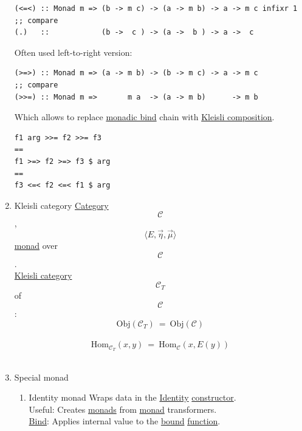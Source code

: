 \documentclass[11pt]{article}
\begin{document}
\begin{enumerate}
\begin{verbatim}
(<=<) :: Monad m => (b -> m c) -> (a -> m b) -> a -> m c infixr 1
;; compare
(.)   ::            (b ->  c ) -> (a ->  b ) -> a ->  c
\end{verbatim}

Often used left-to-right version:\\

\begin{verbatim}
(>=>) :: Monad m => (a -> m b) -> (b -> m c) -> a -> m c
;; compare
(>>=) :: Monad m =>       m a  -> (a -> m b)      -> m b
\end{verbatim}

Which allows to replace \hyperref[orge903a56]{monadic bind} chain with \hyperref[org0ada36c]{Kleisli composition}.\\

\begin{verbatim}
f1 arg >>= f2 >>= f3
==
f1 >=> f2 >=> f3 $ arg
==
f3 <=< f2 <=< f1 $ arg
\end{verbatim}

\item \label{org7512a35}Kleisli category
\label{sec:orgd411efe}
\hyperref[org0450535]{Category} $$ \mathcal{C} $$, $$ 〈E, \overrightarrow{\eta}, \overrightarrow{\mu}〉 $$ \hyperref[org86a5d95]{monad} over $$ \mathcal{C} $$.\\

\hyperref[org7512a35]{Kleisli category} $$ \mathcal{C}_{T} $$ of $$ \mathcal{C} $$:\\

$$ \mathrm{Obj}(\mathcal{C}_{T}) \ = \ \mathrm{Obj}(\mathcal{C}) $$\\
$$ \mathrm{Hom}_{\mathcal{C}_{T}}(x,y) \ = \ \mathrm{Hom}_{\mathcal{C}}(x,E(y)) $$\\

\item \label{org8c81d13}Special monad
\label{sec:orgd6999e0}
\begin{enumerate}
\item \label{orgfe560c6}Identity monad
\label{sec:orgfa9c839}
Wraps data in the \hyperref[org9b95fd5]{Identity} \hyperref[orgf4d811d]{constructor}.\\

Useful: Creates \hyperref[org0d4a4ef]{monads} from \hyperref[org86a5d95]{monad} transformers.\\

\hyperref[org07cdf3f]{Bind}: Applies internal value to the \hyperref[orgaac83d9]{bound} \hyperref[orge15bc14]{function}.\\


\end{enumerate}
\end{enumerate}
\end{document}
